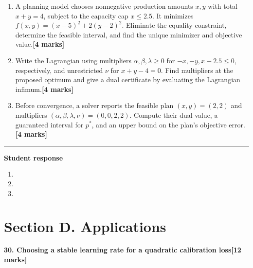 \documentclass[11pt,a4paper]{article}
\newlength{\BlankAnswerHeight}\setlength{\BlankAnswerHeight}{16mm}
\newcommand{\AnswerBlank}{\leavevmode\par\vspace{\BlankAnswerHeight}}
\begin{document}
\begin{enumerate}[label=(\alph*),leftmargin=8mm,itemsep=3pt]
\item A planning model chooses nonnegative production amounts \(x,y\) with total \(x+y=4\), subject to the capacity cap \(x\le2.5\). It minimizes \(f(x,y)=(x-5)^2+2(y-2)^2\). Eliminate the equality constraint, determine the feasible interval, and find the unique minimizer and objective value.\hfill\textbf{[4 marks]}
\item Write the Lagrangian using multipliers \(\alpha,\beta,\lambda\ge0\) for \(-x,-y,x-2.5\le0\), respectively, and unrestricted \(\nu\) for \(x+y-4=0\). Find multipliers at the proposed optimum and give a dual certificate by evaluating the Lagrangian infimum.\hfill\textbf{[4 marks]}
\item Before convergence, a solver reports the feasible plan \((x,y)=(2,2)\) and multipliers \((\alpha,\beta,\lambda,\nu)=(0,0,2,2)\). Compute their dual value, a guaranteed interval for \(p^*\), and an upper bound on the plan's objective error.\hfill\textbf{[4 marks]}
\end{enumerate}\par\medskip\hrule\medskip\textbf{Student response}\par
\begin{enumerate}[label=(\alph*),leftmargin=8mm,itemsep=3pt]
\item
\AnswerBlank
\item
\AnswerBlank
\item
\AnswerBlank
\end{enumerate}
\newpage\section*{Section D. Applications}
\textbf{30. Choosing a stable learning rate for a quadratic calibration loss}\hfill\textbf{[12 marks]}\par\medskip
\end{document}
